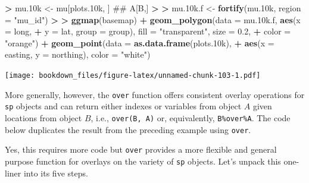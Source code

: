 \documentclass[]{krantz}
\makeatletter
\newenvironment{Shaded}{\begin{snugshade}}{\end{snugshade}}
\newcommand{\KeywordTok}[1]{\textcolor[rgb]{0.27,0.27,0.27}{\textbf{#1}}}
\newcommand{\DataTypeTok}[1]{\textcolor[rgb]{0.27,0.27,0.27}{#1}}
\newcommand{\FloatTok}[1]{\textcolor[rgb]{0.06,0.06,0.06}{#1}}
\newcommand{\StringTok}[1]{\textcolor[rgb]{0.5,0.5,0.5}{#1}}
\newcommand{\OperatorTok}[1]{\textcolor[rgb]{0.43,0.43,0.43}{\textbf{#1}}}
\newcommand{\ErrorTok}[1]{\textcolor[rgb]{0.14,0.14,0.14}{\textbf{#1}}}
\newcommand{\NormalTok}[1]{#1}
\newenvironment{kframe}{%
\medskip{}
\setlength{\fboxsep}{.8em}
 \def\at@end@of@kframe{}%
 \ifinner\ifhmode%
  \def\at@end@of@kframe{\end{minipage}}%
  \begin{minipage}{\columnwidth}%
 \fi\fi%
 \def\FrameCommand##1{\hskip\@totalleftmargin \hskip-\fboxsep
 \colorbox{shadecolor}{##1}\hskip-\fboxsep
     \hskip-\linewidth \hskip-\@totalleftmargin \hskip\columnwidth}%
 \MakeFramed {\advance\hsize-\width
   \@totalleftmargin\z@ \linewidth\hsize
   \@setminipage}}%
 {\par\unskip\endMakeFramed%
 \at@end@of@kframe}
\renewenvironment{Shaded}{\begin{kframe}}{\end{kframe}}
\theoremstyle{definition}
\theoremstyle{definition}
\theoremstyle{definition}
\theoremstyle{remark}
\makeatother
\begin{document}
\begin{Shaded}
\begin{Highlighting}[]
\OperatorTok{>}\StringTok{ }\NormalTok{mu.10k <-}\StringTok{ }\NormalTok{mu[plots.10k, ]  ## A[B,]}
\OperatorTok{>}\StringTok{ }
\ErrorTok{>}\StringTok{ }\NormalTok{mu.10k.f <-}\StringTok{ }\KeywordTok{fortify}\NormalTok{(mu.10k, }\DataTypeTok{region =} \StringTok{"mu_id"}\NormalTok{)}
\OperatorTok{>}\StringTok{ }
\ErrorTok{>}\StringTok{ }\KeywordTok{ggmap}\NormalTok{(basemap) }\OperatorTok{+}\StringTok{ }\KeywordTok{geom_polygon}\NormalTok{(}\DataTypeTok{data =}\NormalTok{ mu.10k.f, }\KeywordTok{aes}\NormalTok{(}\DataTypeTok{x =}\NormalTok{ long, }
\OperatorTok{+}\StringTok{   }\DataTypeTok{y =}\NormalTok{ lat, }\DataTypeTok{group =}\NormalTok{ group), }\DataTypeTok{fill =} \StringTok{"transparent"}\NormalTok{, }\DataTypeTok{size =} \FloatTok{0.2}\NormalTok{, }
\OperatorTok{+}\StringTok{   }\DataTypeTok{color =} \StringTok{"orange"}\NormalTok{) }\OperatorTok{+}\StringTok{ }\KeywordTok{geom_point}\NormalTok{(}\DataTypeTok{data =} \KeywordTok{as.data.frame}\NormalTok{(plots.10k), }
\OperatorTok{+}\StringTok{   }\KeywordTok{aes}\NormalTok{(}\DataTypeTok{x =}\NormalTok{ easting, }\DataTypeTok{y =}\NormalTok{ northing), }\DataTypeTok{color =} \StringTok{"white"}\NormalTok{)}
\end{Highlighting}
\end{Shaded}

\texttt{[image: bookdown\_files/figure-latex/unnamed-chunk-103-1.pdf]}

More generally, however, the \texttt{over} function offers consistent
overlay operations for \texttt{sp} objects and can return either indexes
or variables from object \(A\) given locations from object \(B\), i.e.,
\texttt{over(B,\ A)} or, equivalently, \texttt{B\%over\%A}. The code
below duplicates the result from the preceding example using
\texttt{over}.

\begin{Shaded}
\end{Shaded}

Yes, this requires more code but \texttt{over} provides a more flexible
and general purpose function for overlays on the variety of \texttt{sp}
objects. Let's unpack this one-liner into its five steps.
\end{document}
